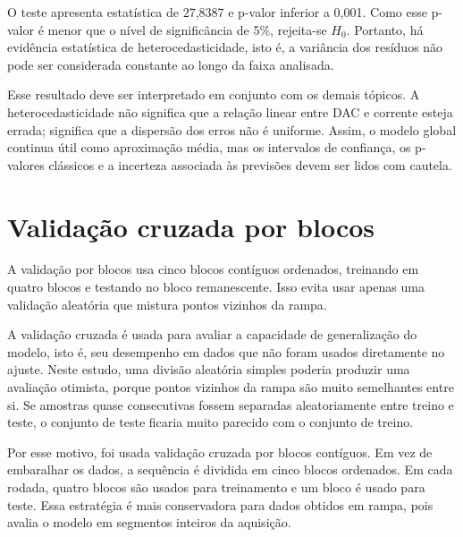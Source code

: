 \documentclass[
  brazilian,
]{article}
\renewcommand{\_}{\oldunderscore\discretionary{}{}{}}
\begin{document}
O teste apresenta estatística de 27,8387 e p-valor inferior a 0,001.
Como esse p-valor é menor que o nível de significância de 5\%, rejeita-se
\(H_0\). Portanto, há evidência estatística de heterocedasticidade, isto é,
a variância dos resíduos não pode ser considerada constante ao longo da
faixa analisada.

Esse resultado deve ser interpretado em conjunto com os demais tópicos. A
heterocedasticidade não significa que a relação linear entre DAC e
corrente esteja errada; significa que a dispersão dos erros não é
uniforme. Assim, o modelo global continua útil como aproximação média, mas
os intervalos de confiança, os p-valores clássicos e a incerteza associada
às previsões devem ser lidos com cautela.

\section{Validação cruzada por
blocos}\label{validauxe7uxe3o-cruzada-por-blocos}

A validação por blocos usa cinco blocos contíguos ordenados, treinando
em quatro blocos e testando no bloco remanescente. Isso evita usar
apenas uma validação aleatória que mistura pontos vizinhos da rampa.

A validação cruzada é usada para avaliar a capacidade de generalização do
modelo, isto é, seu desempenho em dados que não foram usados diretamente
no ajuste. Neste estudo, uma divisão aleatória simples poderia produzir
uma avaliação otimista, porque pontos vizinhos da rampa são muito
semelhantes entre si. Se amostras quase consecutivas fossem separadas
aleatoriamente entre treino e teste, o conjunto de teste ficaria muito
parecido com o conjunto de treino.

Por esse motivo, foi usada validação cruzada por blocos contíguos. Em vez
de embaralhar os dados, a sequência é dividida em cinco blocos ordenados.
Em cada rodada, quatro blocos são usados para treinamento e um bloco é
usado para teste. Essa estratégia é mais conservadora para dados obtidos
em rampa, pois avalia o modelo em segmentos inteiros da aquisição.
\end{document}
